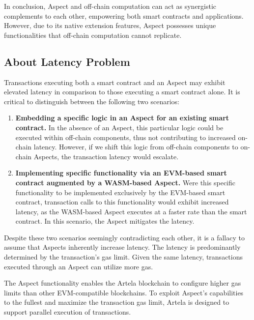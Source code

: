 In conclusion, Aspect and off-chain computation can act as synergistic complements to each other, empowering both smart contracts and applications. However, due to its native extension features, Aspect possesses unique functionalities that off-chain computation cannot replicate.

\subsection{About Latency Problem}

Transactions executing both a smart contract and an Aspect may exhibit elevated latency in comparison to those executing a smart contract alone. It is critical to distinguish between the following two scenarios:

\begin{enumerate}
  \item \textbf{Embedding a specific logic in an Aspect for an existing smart contract.} In the absence of an Aspect, this particular logic could be executed within off-chain components, thus not contributing to increased on-chain latency. However, if we shift this logic from off-chain components to on-chain Aspects, the transaction latency would escalate.
  \item \textbf{Implementing specific functionality via an EVM-based smart contract augmented by a WASM-based Aspect.} Were this specific functionality to be implemented exclusively by the EVM-based smart contract, transaction calls to this functionality would exhibit increased latency, as the WASM-based Aspect executes at a faster rate than the smart contract. In this scenario, the Aspect mitigates the latency.
\end{enumerate}

Despite these two scenarios seemingly contradicting each other, it is a fallacy to assume that Aspects inherently increase latency. The latency is predominantly determined by the transaction's gas limit. Given the same latency, transactions executed through an Aspect can utilize more gas.

The Aspect functionality enables the Artela blockchain to configure higher gas limits than other EVM-compatible blockchains. To exploit Aspect's capabilities to the fullest and maximize the transaction gas limit, Artela is designed to support parallel execution of transactions.
